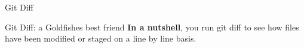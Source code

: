 \begin{frame}{Git Diff}
    \begin{block}{Git Diff: a Goldfishes best friend}
    \textbf{In a nutshell}, you run git diff to see how files have been modified or staged on a line by line basis.
    
    \end{block}
\end{frame}
